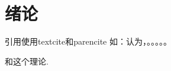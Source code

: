 
\chapter{绪论}
\label{章：绪论}

引用使用textcite和parencite
如：\textcite{RN1327}认为，。。。。。

和这个理论\parencite{RN275}.
